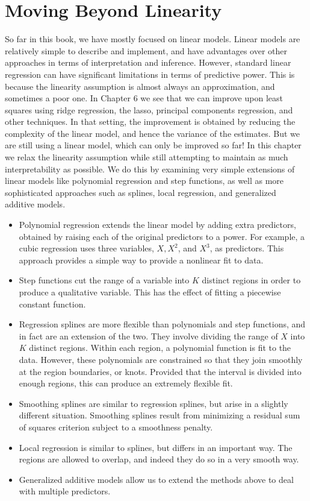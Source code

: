 \documentclass[10pt]{article}
\begin{document}
\section*{Moving Beyond Linearity}
So far in this book, we have mostly focused on linear models. Linear models are relatively simple to describe and implement, and have advantages over other approaches in terms of interpretation and inference. However, standard linear regression can have significant limitations in terms of predictive power. This is because the linearity assumption is almost always an approximation, and sometimes a poor one. In Chapter 6 we see that we can improve upon least squares using ridge regression, the lasso, principal components regression, and other techniques. In that setting, the improvement is obtained by reducing the complexity of the linear model, and hence the variance of the estimates. But we are still using a linear model, which can only be improved so far! In this chapter we relax the linearity assumption while still attempting to maintain as much interpretability as possible. We do this by examining very simple extensions of linear models like polynomial regression and step functions, as well as more sophisticated approaches such as splines, local regression, and generalized additive models.

\begin{itemize}
  \item Polynomial regression extends the linear model by adding extra predictors, obtained by raising each of the original predictors to a power. For example, a cubic regression uses three variables, $X, X^{2}$, and $X^{3}$, as predictors. This approach provides a simple way to provide a nonlinear fit to data.
  \item Step functions cut the range of a variable into $K$ distinct regions in order to produce a qualitative variable. This has the effect of fitting a piecewise constant function.
  \item Regression splines are more flexible than polynomials and step functions, and in fact are an extension of the two. They involve dividing the range of $X$ into $K$ distinct regions. Within each region, a polynomial function is fit to the data. However, these polynomials are constrained so that they join smoothly at the region boundaries, or knots. Provided that the interval is divided into enough regions, this can produce an extremely flexible fit.
  \item Smoothing splines are similar to regression splines, but arise in a slightly different situation. Smoothing splines result from minimizing a residual sum of squares criterion subject to a smoothness penalty.
  \item Local regression is similar to splines, but differs in an important way. The regions are allowed to overlap, and indeed they do so in a very smooth way.
  \item Generalized additive models allow us to extend the methods above to deal with multiple predictors.
\end{itemize}
\end{document}
